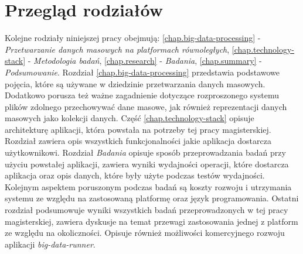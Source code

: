\section{Przegląd rodziałów}
Kolejne rodziały niniejszej pracy obejmują: \ref{chap.big-data-processing} - \textit{Przetwarzanie danych masowych na platformach równoległych}, \ref{chap.technology-stack} - \textit{Metodologia badań}, \ref{chap.research} - \textit{Badania}, \ref{chap.summary} - \textit{Podsumowanie}. Rozdział \ref{chap.big-data-processing} przedstawia podstawowe pojęcia, które są używane w dziedzinie przetwarzania danych masowych. Dodatkowo porusza też ważne zagadnienie dotyczące rozproszonego systemu plików zdolnego przechowywać dane masowe, jak również reprezentacji danych masowych jako kolekcji danych. Część \ref{chap.technology-stack} opisuje architekturę aplikacji, która powstała na potrzeby tej pracy magisterskiej. Rozdział zawiera opis wszystkich funkcjonalności jakie aplikacja dostarcza użytkownikowi. Rozdział \textit{Badania} opisuje sposób przeprowadzania badań przy użyciu powstałej aplikacji, zawiera wyniki wydajności operacji, które dostarcza aplikacja oraz opis danych, które były użyte podczas testów wydajności. Kolejnym aspektem poruszonym podczas badań są koszty rozwoju i utrzymania systemu ze względu na zastosowaną platformę oraz język programowania. Ostatni rozdział podsumowuje wyniki wszystkich badań przeprowadzonych w tej pracy magisterskiej, zawiera dyskusje na temat przewagi zastosowania jednej z platform ze względu na okoliczności. Opisuje również możliwości komercyjnego rozwoju aplikacji \textit{big-data-runner}.
